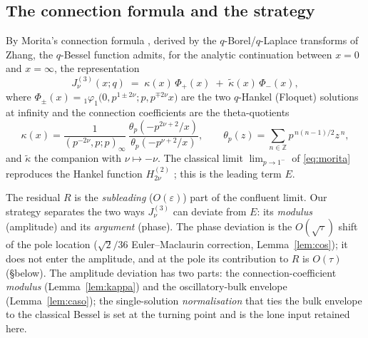 \subsection{The connection formula and the strategy}
By Morita's connection formula \cite{Morita2011}, derived by the $q$-Borel/$q$-Laplace
transforms of Zhang, the $q$-Bessel function admits, for the analytic continuation between
$x=0$ and $x=\infty$, the representation
\begin{equation}\label{eq:morita}
   J^{(3)}_{\nu}(x;q)\;=\;\kappa(x)\,\Phi_{+}(x)\;+\;\tilde\kappa(x)\,\Phi_{-}(x),
\end{equation}
where $\Phi_{\pm}(x)={}_1\varphi_1\!\big(0,p^{1\pm2\nu};p,p^{\mp2\nu}x\big)$ are the two
$q$-Hankel (Floquet) solutions at infinity and the connection coefficients are the
theta-quotients
\begin{equation}\label{eq:kappa}
   \kappa(x)=\frac{1}{(p^{-2\nu},p;p)_\infty}\,
             \frac{\theta_p(-p^{2\nu+2}/x)}{\theta_p(-p^{\nu+2}/x)},\qquad
   \theta_p(z)=\sum_{n\in\mathbb Z}p^{\,n(n-1)/2}z^{\,n},
\end{equation}
and $\tilde\kappa$ the companion with $\nu\mapsto-\nu$. The classical limit
$\lim_{p\to1^-}$ of \eqref{eq:morita} reproduces the Hankel function $H^{(2)}_{2\nu}$
\cite[Thm.~3.3]{Morita2011}; this is the leading term $E$.

The residual $R$ is the \emph{subleading} ($O(\varepsilon)$) part of the confluent limit.
Our strategy separates the two ways $J^{(3)}_\nu$ can deviate from $E$:
its \emph{modulus} (amplitude) and its \emph{argument} (phase). The phase deviation is the
$O(\sqrt\tau)$ shift of the pole location ($\sqrt2/36$ Euler--Maclaurin correction,
Lemma~\ref{lem:cos}); it does not enter the amplitude, and at the pole its contribution to
$R$ is $O(\tau)$ (\S below). The amplitude deviation has two parts: the connection-coefficient
\emph{modulus} (Lemma~\ref{lem:kappa}) and the oscillatory-bulk envelope
(Lemma~\ref{lem:caso}); the single-solution \emph{normalisation} that ties the bulk envelope
to the classical Bessel is set at the turning point and is the lone input retained here.

